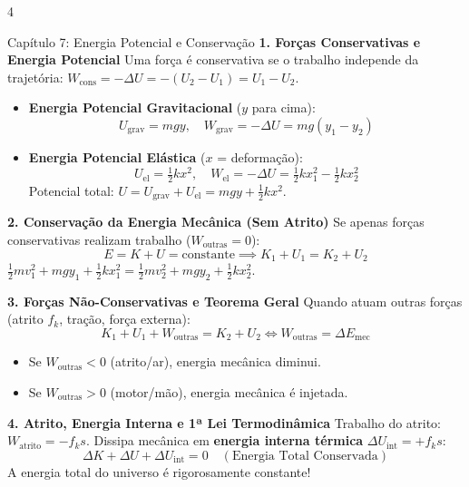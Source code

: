 \documentclass[9pt,a4paper,landscape]{extarticle}
\begin{document}
\begin{multicols*}{4}
\begin{greenbox}{Capítulo 7: Energia Potencial e Conservação}
\textbf{1. Forças Conservativas e Energia Potencial}
Uma força é conservativa se o trabalho independe da trajetória: $W_{\text{cons}} = -\Delta U = -(U_2 - U_1) = U_1 - U_2$.
\begin{itemize}
    \item \textbf{Energia Potencial Gravitacional} ($y$ para cima):
    \begin{equation*}
        U_{\text{grav}} = mgy, \quad W_{\text{grav}} = -\Delta U = mg(y_1 - y_2)
    \end{equation*}
    \item \textbf{Energia Potencial Elástica} ($x$ = deformação):
    \begin{equation*}
        U_{\text{el}} = \tfrac{1}{2} k x^2, \quad W_{\text{el}} = -\Delta U = \tfrac{1}{2} k x_1^2 - \tfrac{1}{2} k x_2^2
    \end{equation*}
    Potencial total: $U = U_{\text{grav}} + U_{\text{el}} = mgy + \frac{1}{2}kx^2$.
\end{itemize}

\textbf{2. Conservação da Energia Mecânica (Sem Atrito)}
Se apenas forças conservativas realizam trabalho ($W_{\text{outras}} = 0$):
\begin{equation*}
    E = K + U = \text{constante} \implies K_1 + U_1 = K_2 + U_2
\end{equation*}
$\frac{1}{2}mv_1^2 + mgy_1 + \frac{1}{2}kx_1^2 = \frac{1}{2}mv_2^2 + mgy_2 + \frac{1}{2}kx_2^2$.

\textbf{3. Forças Não-Conservativas e Teorema Geral}
Quando atuam outras forças (atrito $f_k$, tração, força externa):
\begin{equation*}
    K_1 + U_1 + W_{\text{outras}} = K_2 + U_2 \iff W_{\text{outras}} = \Delta E_{\text{mec}}
\end{equation*}
\begin{itemize}
    \item Se $W_{\text{outras}} < 0$ (atrito/ar), energia mecânica diminui.
    \item Se $W_{\text{outras}} > 0$ (motor/mão), energia mecânica é injetada.
\end{itemize}

\textbf{4. Atrito, Energia Interna e 1ª Lei Termodinâmica}
Trabalho do atrito: $W_{\text{atrito}} = -f_k s$. Dissipa mecânica em \textbf{energia interna térmica} $\Delta U_{\text{int}} = +f_k s$:
\begin{equation*}
    \Delta K + \Delta U + \Delta U_{\text{int}} = 0 \quad (\text{Energia Total Conservada})
\end{equation*}
A energia total do universo é rigorosamente constante!
\end{greenbox}


\end{multicols*}
\end{document}
